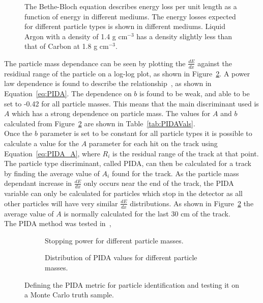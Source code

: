 \begin{figure}[h!]
  \centering
  \caption[The medium and particle type dependence of the Bethe-Bloch equation]
          {The Bethe-Bloch equation describes energy loss per unit length as a function of energy in different mediums. The energy losses expected for different particle types is shown in different mediums. Liquid Argon with a density of 1.4 g cm$^{-3}$ has a density slightly less than that of Carbon at 1.8 g cm$^{-3}$.}
  \label{fig:BetheBloch}
\end{figure}

The particle mass dependance can be seen by plotting the $\frac{dE}{dx}$ against the residiual range of the particle on a log-log plot, as shown in Figure~\ref{fig:PIDA_loglog}. A power law dependence is found to describe the relationship~\citep{PIDA_Paper}, as shown in Equation~\ref{eq:PIDA}. The dependence on $b$ is found to be weak, and able to be set to -0.42 for all particle masses. This means that the main discriminant used is $A$ which has a strong dependence on particle mass. The values for $A$ and $b$ calculated from Figure~\ref{fig:PIDA_loglog} are shown in Table~\ref{tab:PIDAVals}. \\

Once the $b$ parameter is set to be constant for all particle types it is possible to calculate a value for the $A$ parameter for each hit on the track using Equation~\ref{eq:PIDA_A}, where $R_i$ is the residual range of the track at that point. The particle type discriminant, called PIDA, can then be calculated for a track by finding the average value of $A_i$ found for the track. As the particle mass dependant increase in $\frac{dE}{dx}$ only occurs near the end of the track, the PIDA variable can only be calculated for particles which stop in the detector as all other particles will have very similar $\frac{dE}{dx}$ distributions. As shown in Figure~\ref{fig:PIDA_loglog} the average value of $A$ is normally calculated for the last 30 cm of the track. \\

The PIDA method was tested in~\citep{PIDA_Paper}, 

\begin{figure}[h!]
  \centering
  \begin{subfigure}{0.45\textwidth}
    \centering
    \caption{Stopping power for different particle masses.}
    \label{fig:PIDA_loglog}
  \end{subfigure}
  \hspace{0.08\textwidth}
  \begin{subfigure}{0.45\textwidth}
    \centering
    \caption{Distribution of PIDA values for different particle masses.}
    \label{fig:PIDA_MC}
  \end{subfigure}
  \caption[Defining the PIDA metric for particle identification.]
          {Defining the PIDA metric for particle identification and testing it on a Monte Carlo truth sample.}
          \label{fig:PIDAPlots}
\end{figure}

